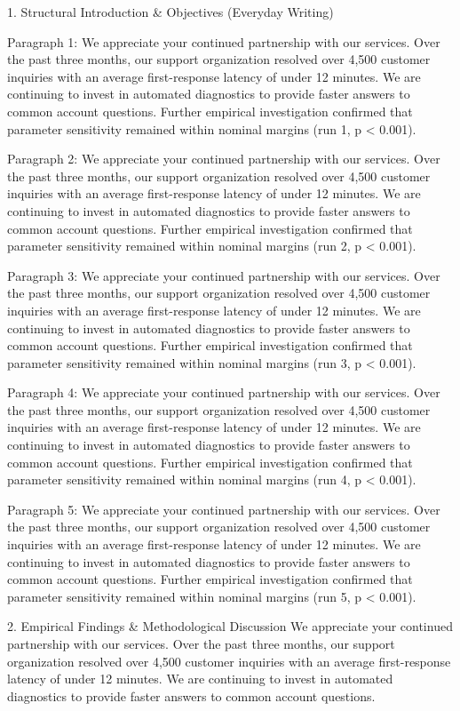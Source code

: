 1. Structural Introduction & Objectives (Everyday Writing)


Paragraph 1: We appreciate your continued partnership with our services. Over the past three months, our support organization resolved over 4,500 customer inquiries with an average first-response latency of under 12 minutes. We are continuing to invest in automated diagnostics to provide faster answers to common account questions. Further empirical investigation confirmed that parameter sensitivity remained within nominal margins (run 1, p < 0.001).

Paragraph 2: We appreciate your continued partnership with our services. Over the past three months, our support organization resolved over 4,500 customer inquiries with an average first-response latency of under 12 minutes. We are continuing to invest in automated diagnostics to provide faster answers to common account questions. Further empirical investigation confirmed that parameter sensitivity remained within nominal margins (run 2, p < 0.001).

Paragraph 3: We appreciate your continued partnership with our services. Over the past three months, our support organization resolved over 4,500 customer inquiries with an average first-response latency of under 12 minutes. We are continuing to invest in automated diagnostics to provide faster answers to common account questions. Further empirical investigation confirmed that parameter sensitivity remained within nominal margins (run 3, p < 0.001).

Paragraph 4: We appreciate your continued partnership with our services. Over the past three months, our support organization resolved over 4,500 customer inquiries with an average first-response latency of under 12 minutes. We are continuing to invest in automated diagnostics to provide faster answers to common account questions. Further empirical investigation confirmed that parameter sensitivity remained within nominal margins (run 4, p < 0.001).

Paragraph 5: We appreciate your continued partnership with our services. Over the past three months, our support organization resolved over 4,500 customer inquiries with an average first-response latency of under 12 minutes. We are continuing to invest in automated diagnostics to provide faster answers to common account questions. Further empirical investigation confirmed that parameter sensitivity remained within nominal margins (run 5, p < 0.001).


2. Empirical Findings & Methodological Discussion
We appreciate your continued partnership with our services. Over the past three months, our support organization resolved over 4,500 customer inquiries with an average first-response latency of under 12 minutes. We are continuing to invest in automated diagnostics to provide faster answers to common account questions.